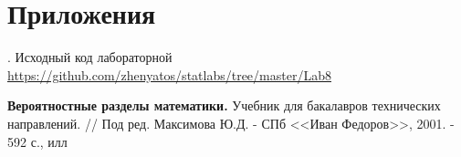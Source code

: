 \documentclass[12pt,a4paper]{article}
\begin{document}
\section{Приложения}\label{sec:appl}
. Исходный код лабораторной {\url{https://github.com/zhenyatos/statlabs/tree/master/Lab8}}

\begin{thebibliography}{9} 
	 \textbf{Вероятностные разделы математики.} Учебник для бакалавров технических направлений. // Под ред. Максимова Ю.Д. - СПб <<Иван Федоров>>, 2001. - 592 с., илл
\end{thebibliography}
\end{document}
